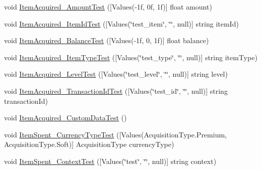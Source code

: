 \begin{DoxyCompactItemize}
\item 
void \mbox{\hyperlink{class_unity_engine_1_1_analytics_1_1_tests_1_1_analytics_event_tests_a3c15530e417e36ef77c8e3bba68d56e9}{Item\+Acquired\+\_\+\+Amount\+Test}} (\mbox{[}Values(-\/1f, 0f, 1f)\mbox{]} float amount)
\item 
void \mbox{\hyperlink{class_unity_engine_1_1_analytics_1_1_tests_1_1_analytics_event_tests_abd8909e60c43428289c7ae4972314c36}{Item\+Acquired\+\_\+\+Item\+Id\+Test}} (\mbox{[}Values(\char`\"{}test\+\_\+item\char`\"{}, \char`\"{}\char`\"{}, null)\mbox{]} string item\+Id)
\item 
void \mbox{\hyperlink{class_unity_engine_1_1_analytics_1_1_tests_1_1_analytics_event_tests_a319c211caf009f3e80f31f1ee6f0b2cc}{Item\+Acquired\+\_\+\+Balance\+Test}} (\mbox{[}Values(-\/1f, 0, 1f)\mbox{]} float balance)
\item 
void \mbox{\hyperlink{class_unity_engine_1_1_analytics_1_1_tests_1_1_analytics_event_tests_a1003aad16f854069ea7643dfd06abe21}{Item\+Acquired\+\_\+\+Item\+Type\+Test}} (\mbox{[}Values(\char`\"{}test\+\_\+type\char`\"{}, \char`\"{}\char`\"{}, null)\mbox{]} string item\+Type)
\item 
void \mbox{\hyperlink{class_unity_engine_1_1_analytics_1_1_tests_1_1_analytics_event_tests_ad590072b0ef1a0577d8ee1f0c0d5d313}{Item\+Acquired\+\_\+\+Level\+Test}} (\mbox{[}Values(\char`\"{}test\+\_\+level\char`\"{}, \char`\"{}\char`\"{}, null)\mbox{]} string level)
\item 
void \mbox{\hyperlink{class_unity_engine_1_1_analytics_1_1_tests_1_1_analytics_event_tests_af55499f2b70d2cb7a113a95ebbb6945f}{Item\+Acquired\+\_\+\+Transaction\+Id\+Test}} (\mbox{[}Values(\char`\"{}test\+\_\+id\char`\"{}, \char`\"{}\char`\"{}, null)\mbox{]} string transaction\+Id)
\item 
void \mbox{\hyperlink{class_unity_engine_1_1_analytics_1_1_tests_1_1_analytics_event_tests_a011b69d1581d5e4b471b633d6e53ed0f}{Item\+Acquired\+\_\+\+Custom\+Data\+Test}} ()
\item 
void \mbox{\hyperlink{class_unity_engine_1_1_analytics_1_1_tests_1_1_analytics_event_tests_a1c1d0973b8b39a33133a0c144cc1c2ad}{Item\+Spent\+\_\+\+Currency\+Type\+Test}} (\mbox{[}Values(Acquisition\+Type.\+Premium, Acquisition\+Type.\+Soft)\mbox{]} Acquisition\+Type currency\+Type)
\item 
void \mbox{\hyperlink{class_unity_engine_1_1_analytics_1_1_tests_1_1_analytics_event_tests_a3eab110b01b749ea42e31b7ef60f9a34}{Item\+Spent\+\_\+\+Context\+Test}} (\mbox{[}Values(\char`\"{}test\char`\"{}, \char`\"{}\char`\"{}, null)\mbox{]} string context)

\end{DoxyCompactItemize}
